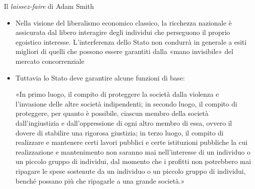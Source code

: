 \documentclass[aspectratio=64,12pt]{beamer}
\begin{document}
\begin{frame}{Il \emph{laissez-faire} di Adam Smith}
\begin{itemize}
\item Nella visione del \alert{liberalismo economico classico}, la ricchezza nazionale è assicurata dal libero interagire degli individui che perseguono il proprio egoistico interesse. L’interferenza dello Stato non condurrà in generale a esiti migliori di quelli che possono essere garantiti dalla \alert{«mano invisibile»} del mercato concorrenziale
\item Tuttavia lo Stato deve garantire alcune funzioni di base:

\begin{quoting}
\fontsize{10}{11}\selectfont
«In primo luogo, il compito di proteggere la società dalla violenza e l’invasione delle altre società indipendenti; in secondo luogo, il compito di proteggere, per quanto è possibile, ciascun membro della società dall’ingiustizia e dall’oppressione di ogni altro membro di essa, ovvero il dovere di stabilire una rigorosa giustizia; in terzo luogo, il compito di realizzare e mantenere certi lavori pubblici e certe istituzioni pubbliche la cui realizzazione e mantenimento non saranno mai nell’interesse di un individuo o un piccolo gruppo di individui, dal momento che i profitti non potrebbero mai ripagare le spese sostenute da un individuo o un piccolo gruppo di individui, benché possano più che ripagarle a una grande società.»
\end{quoting}
\end{itemize}
\end{frame}
\end{document}
